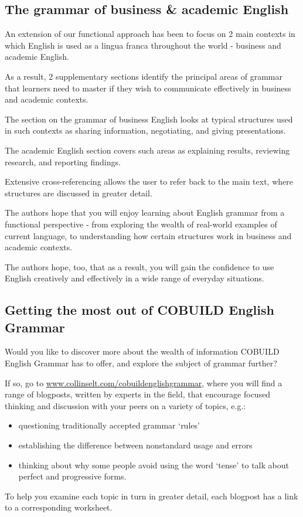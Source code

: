 \documentclass[oneside]{book}
\numberwithin{equation}{section}
\begin{document}
\subsection{The grammar of business \& academic English}
An extension of our functional approach has been to focus on 2 main contexts in which English is used as a lingua franca throughout the world - business and academic English.

%
As a result, 2 supplementary sections identify the principal areas of grammar that learners need to master if they wish to communicate effectively in business and academic contexts.

%
The section on the grammar of business English looks at typical structures used in such contexts as sharing information, negotiating, and giving presentations.

The academic English section covers such areas as explaining results, reviewing research, and reporting findings.

Extensive cross-referencing allows the user to refer back to the main text, where structures are discussed in greater detail.

%
The authors hope that you will enjoy learning about English grammar from a functional perspective - from exploring the wealth of real-world examples of current language, to understanding how certain structures work in business and academic contexts.

The authors hope, too, that as a result, you will gain the confidence to use English creatively and effectively in a wide range of everyday situations.

\subsection{Getting the most out of COBUILD English Grammar}
Would you like to discover more about the wealth of information COBUILD English Grammar has to offer, and explore the subject of grammar further?

If so, go to \url{www.collinselt.com/cobuildenglishgrammar}, where you will find a range of blogposts, written by experts in the field, that encourage focused thinking and discussion with your peers on a variety of topics, e.g.:
\begin{itemize}
    \item questioning traditionally accepted grammar `rules'
    \item establishing the difference between nonstandard usage and errors
    \item thinking about why some people avoid using the word `tense' to talk about perfect and progressive forms.
\end{itemize}
To help you examine each topic in turn in greater detail, each blogpost has a link to a corresponding worksheet.
\end{document}
